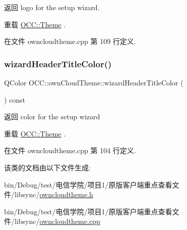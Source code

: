 \begin{DoxyReturn}{返回}
logo for the setup wizard. 
\end{DoxyReturn}


重载 \hyperlink{class_o_c_c_1_1_theme_a6263d9c402834d60ce0fd6ee71b5cbbe}{O\+C\+C\+::\+Theme} .



在文件 owncloudtheme.\+cpp 第 109 行定义.

\mbox{\label{class_o_c_c_1_1own_cloud_theme_a7eb765922b1798d364003d1c9328c65e}} 
\subsubsection{\texorpdfstring{wizard\+Header\+Title\+Color()}{wizardHeaderTitleColor()}}
{\footnotesize\ttfamily Q\+Color O\+C\+C\+::own\+Cloud\+Theme\+::wizard\+Header\+Title\+Color (\begin{DoxyParamCaption}{ }\end{DoxyParamCaption}) const\hspace{0.3cm}{\ttfamily [virtual]}}

\begin{DoxyReturn}{返回}
color for the setup wizard 
\end{DoxyReturn}


重载 \hyperlink{class_o_c_c_1_1_theme_ac819e011427048af3c7e50ad34f6f77f}{O\+C\+C\+::\+Theme} .



在文件 owncloudtheme.\+cpp 第 104 行定义.



该类的文档由以下文件生成\+:\begin{DoxyCompactItemize}
\item 
bin/\+Debug/test/电信学院/项目1/原版客户端重点查看文件/libsync/\hyperlink{owncloudtheme_8h}{owncloudtheme.\+h}\item 
bin/\+Debug/test/电信学院/项目1/原版客户端重点查看文件/libsync/\hyperlink{owncloudtheme_8cpp}{owncloudtheme.\+cpp}\end{DoxyCompactItemize}
